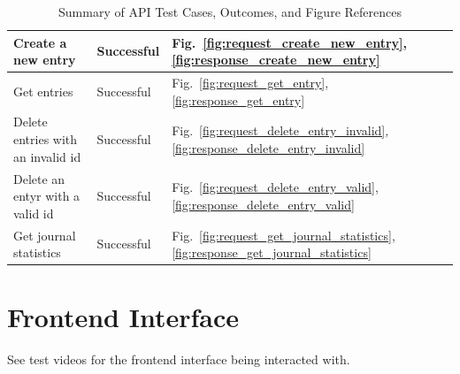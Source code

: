 \begin{table}[H]
\begin{tabular}{|l|l|l|}
Create a new entry                             & Successful      & Fig.~\ref{fig:request_create_new_entry}, \ref{fig:response_create_new_entry} \\ \hline
Get entries                                   & Successful      & Fig.~\ref{fig:request_get_entry}, \ref{fig:response_get_entry} \\ \hline
Delete entries with an invalid id             & Successful      & Fig.~\ref{fig:request_delete_entry_invalid}, \ref{fig:response_delete_entry_invalid} \\ \hline
Delete an entyr with a valid id                & Successful      & Fig.~\ref{fig:request_delete_entry_valid}, \ref{fig:response_delete_entry_valid} \\ \hline
Get journal statistics                         & Successful      & Fig.~\ref{fig:request_get_journal_statistics}, \ref{fig:response_get_journal_statistics} \\ \hline
\end{tabular}
\caption{Summary of API Test Cases, Outcomes, and Figure References}
\label{table:test_cases_summary}
\end{table}

\newpage

\section{Frontend Interface}    
See test videos for the frontend interface being interacted with.

